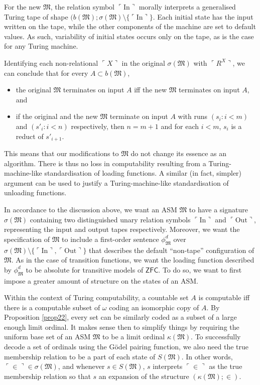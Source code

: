 \documentclass[12pt]{article}
\numberwithin{equation}{section}
\begin{document}
For the new $\mathfrak{M}$, the relation symbol $\ulcorner \mathrm{In} \urcorner$ morally interprets a generalised Turing tape of shape $(b(\mathfrak{M}); \sigma(\mathfrak{M}) \setminus \{\ulcorner \mathrm{In} \urcorner\}$. Each initial state has the input written on the tape, while the other components of the machine are set to default values. As such, variability of initial states occurs only on the tape, as is the case for any Turing machine. 

Identifying each non-relational $\ulcorner X \urcorner$ in the original $\sigma(\mathfrak{M})$ with $\ulcorner R^X \urcorner$, we can conclude that for every $A \subset b(\mathfrak{M})$, 
\begin{itemize}
    \item the original $\mathfrak{M}$ terminates on input $A$ iff the new $\mathfrak{M}$ terminates on input $A$, and
    \item if the original and the new $\mathfrak{M}$ terminate on input $A$ with runs $(s_i : i < m)$ and $(s'_i : i < n)$ respectively, then $n = m + 1$ and for each $i < m$, $s_i$ is a reduct of $s'_{i+1}$.
\end{itemize} 
This means that our modifications to $\mathfrak{M}$ do not change its essence as an algorithm. There is thus no loss in computability resulting from a Turing-machine-like standardisation of loading functions. A similar (in fact, simpler) argument can be used to justify a Turing-machine-like standardisation of unloading functions.

In accordance to the discussion above, we want an ASM $\mathfrak{M}$ to have a signature $\sigma(\mathfrak{M})$ containing two distinguished unary relation symbols $\ulcorner \mathrm{In} \urcorner$ and $\ulcorner \mathrm{Out} \urcorner$, representing the input and output tapes respectively. Moreover, we want the specification of $\mathfrak{M}$ to include a first-order sentence $\phi^d_{\mathfrak{M}}$ over $\sigma(\mathfrak{M}) \setminus \{\ulcorner \mathrm{In} \urcorner, \ulcorner \mathrm{Out} \urcorner\}$ that describes the default ``non-tape'' configuration of $\mathfrak{M}$. As in the case of transition functions, we want the loading function described by $\phi^d_{\mathfrak{M}}$ to be absolute for transitive models of $\mathsf{ZFC}$. To do so, we want to first impose a greater amount of structure on the states of an ASM.

Within the context of Turing computability, a countable set $A$ is computable iff there is a computable subset of $\omega$ coding an isomorphic copy of $A$. By Proposition \ref{prop22}, every set can be similarly coded as a subset of a large enough limit ordinal. It makes sense then to simplify things by requiring the uniform base set of an ASM $\mathfrak{M}$ to be a limit ordinal $\kappa(\mathfrak{M})$. To successfully decode a set of ordinals using the G\"{o}del pairing function, we also need the true membership relation to be a part of each state of $S(\mathfrak{M})$. In other words, $\ulcorner \in \urcorner \in \sigma(\mathfrak{M})$, and whenever $s \in S(\mathfrak{M})$, $s$ interprets $\ulcorner \in \urcorner$ as the true membership relation so that $s$ an expansion of the structure $(\kappa(\mathfrak{M}); \in)$.
\end{document}
